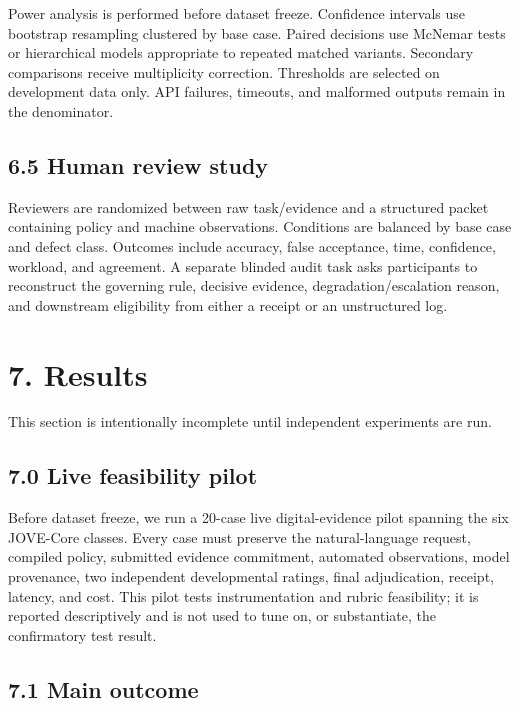 \documentclass[11pt]{article}
\begin{document}
Power analysis is performed before dataset freeze. Confidence intervals use bootstrap resampling clustered by base case. Paired decisions use McNemar tests or hierarchical models appropriate to repeated matched variants. Secondary comparisons receive multiplicity correction. Thresholds are selected on development data only. API failures, timeouts, and malformed outputs remain in the denominator.\par

\subsection{6.5 Human review study}

Reviewers are randomized between raw task/evidence and a structured packet containing policy and machine observations. Conditions are balanced by base case and defect class. Outcomes include accuracy, false acceptance, time, confidence, workload, and agreement. A separate blinded audit task asks participants to reconstruct the governing rule, decisive evidence, degradation/escalation reason, and downstream eligibility from either a receipt or an unstructured log.\par

\section{7. Results}

This section is intentionally incomplete until independent experiments are run.\par

\subsection{7.0 Live feasibility pilot}

Before dataset freeze, we run a 20-case live digital-evidence pilot spanning the six JOVE-Core classes. Every case must preserve the natural-language request, compiled policy, submitted evidence commitment, automated observations, model provenance, two independent developmental ratings, final adjudication, receipt, latency, and cost. This pilot tests instrumentation and rubric feasibility; it is reported descriptively and is not used to tune on, or substantiate, the confirmatory test result.\par

\subsection{7.1 Main outcome}
\end{document}
